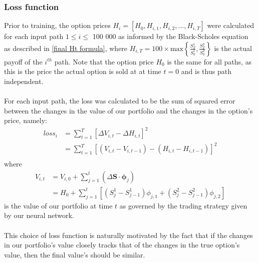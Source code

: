 \documentclass{article}
\theoremstyle{definition}
\begin{document}
\subsubsection{Loss function}
Prior to training, the option prices $H_{i} = [H_{0}, H_{i,1}, H_{i,2},...,H_{i,T}]$ were calculated for each input path $1 \leq i \leq$ 100 000 as informed by the Black-Scholes equation as described in \ref{final Ht formula}, where $H_{i,T} = 100 \times \text{max}\left\{\frac{S^{1}_{T}}{S^{1}_{0}}, \frac{S^{2}_{T}}{S^{2}_{0}}\right\}$ is the actual payoff of the $i^{th}$ path. Note that the option price $H_0$ is the same for all paths, as this is the price the actual option is sold at at time $t=0$ and is thus path independent.
\\\\
For each input path, the loss was calculated to be the sum of squared error between the changes in the value of our portfolio and the changes in the option's price, namely:
\begin{align}
    loss_i &= \sum_{t=1}^{T}\left[\Delta V_{i,t} - \Delta H_{i,t}\right]^2\\
    &=\sum_{t=1}^{T}\left[\left(V_{i,t}-V_{i,t-1}\right)-\left(H_{i,t}-H_{i,t-1}\right)\right]^2\\
\end{align}
where 
\begin{align}
    V_{i,t} &= V_{i,0} + \sum_{j=1}^{t} (\Delta \boldsymbol{ S}\cdot \boldsymbol{\phi}_{j})\\
    &= H_{0} +\sum_{j=1}^{t} \left[\left(S_{j}^1-S_{j-1}^1\right) \phi_{j,1} + \left(S_{j}^2-S_{j-1}^2\right)\phi_{j,2}\right] 
\end{align} is the value of our portfolio at time $t$ as governed by the trading strategy given by our neural network.
\\\\
This choice of loss function is naturally motivated by the fact that if the changes in our portfolio's value closely tracks that of the changes in the true option's value, then the final value's should be similar.
\end{document}
